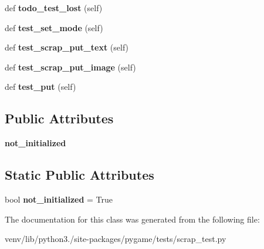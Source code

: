 \begin{DoxyCompactItemize}
def {\bfseries todo\+\_\+test\+\_\+lost} (self)
\item 
\mbox{\label{classpygame_1_1tests_1_1scrap__test_1_1_scrap_module_test_a5790e96513f29294f3584261b758e907}} 
def {\bfseries test\+\_\+set\+\_\+mode} (self)
\item 
\mbox{\label{classpygame_1_1tests_1_1scrap__test_1_1_scrap_module_test_a2b1b9c24e4a92224fdbf6fde3a9133bf}} 
def {\bfseries test\+\_\+scrap\+\_\+put\+\_\+text} (self)
\item 
\mbox{\label{classpygame_1_1tests_1_1scrap__test_1_1_scrap_module_test_a261890154050f117c3f1da4633eba7d6}} 
def {\bfseries test\+\_\+scrap\+\_\+put\+\_\+image} (self)
\item 
\mbox{\label{classpygame_1_1tests_1_1scrap__test_1_1_scrap_module_test_af0154c4e3f0b4e0f6096fa40a39568c2}} 
def {\bfseries test\+\_\+put} (self)
\end{DoxyCompactItemize}
\subsection*{Public Attributes}
\begin{DoxyCompactItemize}
\item 
\mbox{\label{classpygame_1_1tests_1_1scrap__test_1_1_scrap_module_test_ab2dfdda73ff6b3ca683b35caf85abdee}} 
{\bfseries not\+\_\+initialized}
\end{DoxyCompactItemize}
\subsection*{Static Public Attributes}
\begin{DoxyCompactItemize}
\item 
\mbox{\label{classpygame_1_1tests_1_1scrap__test_1_1_scrap_module_test_a38b0cd45ec13723863f2bbd02763b62a}} 
bool {\bfseries not\+\_\+initialized} = True
\end{DoxyCompactItemize}


The documentation for this class was generated from the following file\+:\begin{DoxyCompactItemize}
\item 
venv/lib/python3./site-\/packages/pygame/tests/scrap\+\_\+test.\+py\end{DoxyCompactItemize}
